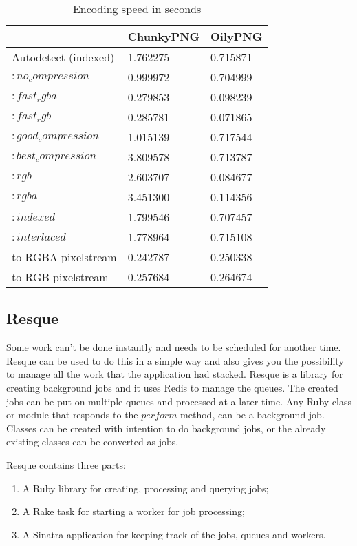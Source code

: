 \begin{table}[ht!]
\centering
\caption{Encoding speed in seconds}
{
\renewcommand{\arraystretch}{1.25}
\begin{tabular}{ lll }
                        & ChunkyPNG   &   OilyPNG \\ \hline
Autodetect (indexed)    & 1.762275    & 0.715871 \\
$:no_compression$       & 0.999972    & 0.704999 \\
$:fast_rgba$            & 0.279853    & 0.098239 \\
$:fast_rgb$             & 0.285781    & 0.071865 \\
$:good_compression$     & 1.015139    & 0.717544 \\
$:best_compression$     & 3.809578    & 0.713787 \\
$:rgb$                  & 2.603707    & 0.084677 \\
$:rgba$                 & 3.451300    & 0.114356 \\
$:indexed$              & 1.799546    & 0.707457 \\
$:interlaced$           & 1.778964    & 0.715108 \\
to RGBA pixelstream     & 0.242787    & 0.250338 \\
to RGB pixelstream      & 0.257684    & 0.264674 \\
\end{tabular}
}
\label{encoding_speed}
\end{table}



\subsection{Resque}
Some work can't be done instantly and needs to be scheduled for another time. Resque can be used to do this in a simple way and also gives you the possibility to manage all the work that the application had stacked.
Resque is a library for creating background jobs and it uses Redis to manage the queues. The created jobs can be put on multiple queues and processed at a later time.
Any Ruby class or module that responds to the $perform$ method, can be a background job. Classes can be created with intention to do background jobs, or the already existing classes can be converted as jobs.

Resque contains three parts:

\begin{enumerate}
  \item A Ruby library for creating, processing and querying jobs;
  \item A Rake task for starting a worker for job processing;
  \item A Sinatra application for keeping track of the jobs, queues and workers.
\end{enumerate}

